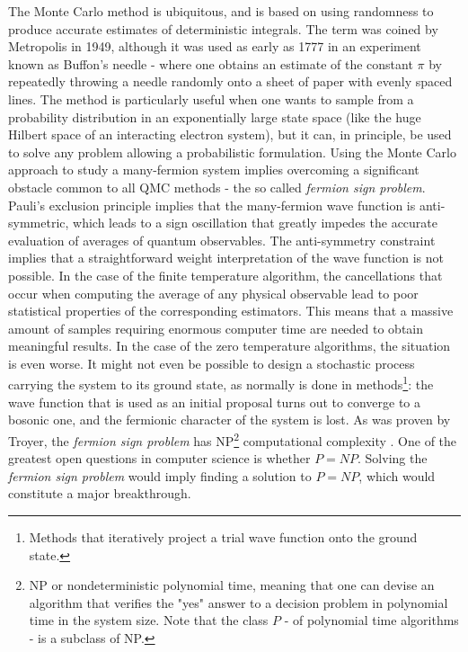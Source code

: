 The Monte Carlo method is ubiquitous, and is based on using randomness to produce accurate estimates of deterministic integrals.
The term was coined by Metropolis in 1949, although it was used as early as 1777 in an experiment known as Buffon's needle - where one obtains an estimate of the constant $\pi$ by repeatedly throwing a needle randomly onto a sheet of paper with evenly spaced lines. %
The method is particularly useful when one wants to sample from a probability distribution in an exponentially large state space (like the huge Hilbert space of an interacting electron system), but it can, in principle, be used to solve any problem allowing a probabilistic formulation.
Using the Monte Carlo approach to study a many-fermion system implies overcoming a significant obstacle common to all \ac{QMC} methods - the so called \emph{fermion sign problem}.
Pauli's exclusion principle implies that the many-fermion wave function is anti-symmetric, which leads to a sign oscillation that greatly impedes the accurate evaluation of averages of quantum observables.
The anti-symmetry constraint implies that a  straightforward weight interpretation of the wave function is not possible.
In the case of the finite temperature algorithm, the cancellations that occur when computing the average of any physical observable lead to poor statistical properties of the corresponding estimators.
This means that a massive amount of samples requiring enormous computer time are needed to obtain meaningful results.
In the case of the zero temperature algorithms, the situation is even worse.
It might not even be possible to design a stochastic process carrying the system to its ground state, as normally is done in  methods\footnote{Methods that iteratively project a trial wave function onto the ground state.}: the wave function that is used as an initial proposal turns out to converge to a bosonic one, and the fermionic character of the system is lost.
As was proven by Troyer, the \emph{fermion sign problem} has NP\footnote{NP or nondeterministic polynomial time, meaning that one can devise an algorithm that verifies the "yes" answer to a decision problem in polynomial time in the system size.
Note that the class $P$ - of polynomial time algorithms - is a subclass of NP.} computational complexity \cite{troyer_computational_2005}.
One of the greatest open questions in computer science is whether $P = NP$.
Solving the \emph{fermion sign problem} would imply finding a solution to $P = NP$, which would constitute a major breakthrough.

